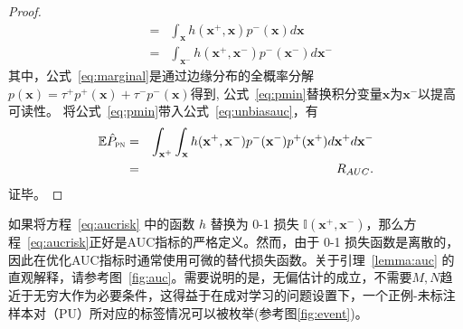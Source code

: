 \begin{lemma}
\begin{proof}
\begin{eqnarray}
			&=& \int_\mathbf{x}h(\mathbf{x}^+,\mathbf{x})p^-(\mathbf{x})d\mathbf{x} \label{eq:variable} \\
			&=& \int_\mathbf{x^-}h(\mathbf{x}^+,\mathbf{x}^-)p^-(\mathbf{x}^-)d\mathbf{x}^- \label{eq:pmin} 
		\end{eqnarray}
其中，公式~\eqref{eq:marginal}是通过边缘分布的全概率分解$p(\mathbf{x})= \tau^+p^+(\mathbf{x}) + \tau^-p^-(\mathbf{x})$得到, 公式~\eqref{eq:pmin}替换积分变量$\mathbf{x}$为$\mathbf{x}^-$以提高可读性。 将公式~\eqref{eq:pmin}带入公式~\eqref{eq:unbiasauc}，有
		\begin{eqnarray}
			\mathbb{E}\hat{P}_\textsc{pn} &=& \int_{\mathbf{x}^+} \int_\mathbf{x}h(\mathbf{x}^+,\mathbf{x}^-)p^-(\mathbf{x}^-) p^+(\mathbf{x}^+)d\mathbf{x}^+d\mathbf{x}^- \label{eq:aucrisk}\\
			&=& R_{AUC}.
		\end{eqnarray}
证毕。
	\end{proof}	
\end{lemma}

如果将方程~\eqref{eq:aucrisk} 中的函数 $h$ 替换为 0-1 损失 $\mathbb{I}(\mathbf{x}^+,\mathbf{x}^-)$，那么方程~\eqref{eq:aucrisk}正好是AUC指标的严格定义。然而，由于 0-1 损失函数是离散的，因此在优化AUC指标时通常使用可微的替代损失函数。关于引理~\ref{lemma:auc} 的直观解释，请参考图~\ref{fig:auc}。需要说明的是，无偏估计的成立，不需要$M,N$趋近于无穷大作为必要条件，这得益于在成对学习的问题设置下，一个正例-未标注样本对（PU）所对应的标签情况可以被枚举(参考图\ref{fig:event})。

